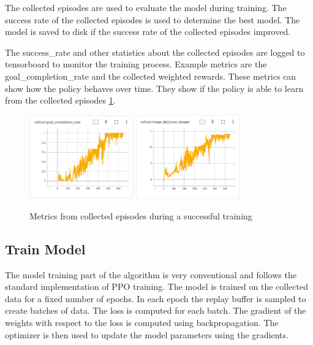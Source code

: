 The collected episodes are used to evaluate the model during training. The success rate of the collected episodes is used to determine the best model. The model is saved to disk if the success rate of the collected episodes improved.


The success\_rate and other statistics about the collected episodes are logged to tensorboard to monitor the training process. Example metrics are the goal\_completion\_rate and the collected weighted rewards.
These metrics can show how the policy behaves over time. They show if the policy is able to learn from the collected episodes \ref{fig:metrics_over_time}.

\begin{figure}
    \centering
    \includegraphics[width=0.4\textwidth]{Bilder/tensorboard_images/successfulTraining_goal_completion_rate.png}
    \includegraphics[width=0.4\textwidth]{Bilder/tensorboard_images/successfulTraining_distance_reward.png}
    \caption{Metrics from collected episodes during a successful training}
    \label{fig:metrics_over_time}
\end{figure}


\subsection{Train Model}

The model training part of the algorithm is very conventional and follows the standard implementation of PPO training. The model is trained on the collected data for a fixed number of epochs. In each epoch the replay buffer is sampled to create batches of data. The loss is computed for each batch. The gradient of the weights with respect to the loss is computed using backpropagation. The optimizer is then used to update the model parameters using the gradients.

